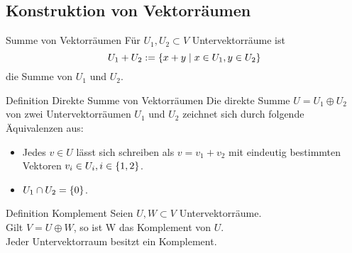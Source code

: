 \documentclass[main.tex]{subfiles}
\begin{document}
\subsection*{Konstruktion von Vektorräumen}
\begin{karte}{Summe von Vektorräumen}
    Für \(U_1, U_2 \subset V\) Untervektorräume ist 
    \[U_1 + U_2 := \{x + y \;\vert\; x \in U_1, y \in U_2\}\]
    die Summe von \(U_1\) und \(U_2\).
\end{karte}
\begin{karte}{Definition Direkte Summe von Vektorräumen}
    Die direkte Summe \(U = U_1 \oplus U_2\) von zwei 
    Untervektorräumen \(U_1\) und \(U_2\) zeichnet sich durch 
    folgende Äquivalenzen aus: 
    \begin{itemize}
        \item Jedes \(v \in U\) lässt sich schreiben als 
        \(v = v_1 + v_2\) mit eindeutig bestimmten Vektoren
        \(v_i \in U_i, i \in \{1,2\}\).
        \item \(U_1 \cap U_2 = \{0\}\).
    \end{itemize}
\end{karte}
\begin{karte}{Definition Komplement}
    Seien \(U,W \subset V\) Untervektorräume.\\
    Gilt \(V = U \oplus W\), so ist W das Komplement von \(U\). \\
    Jeder Untervektorraum besitzt ein Komplement.
\end{karte}
\end{document}

